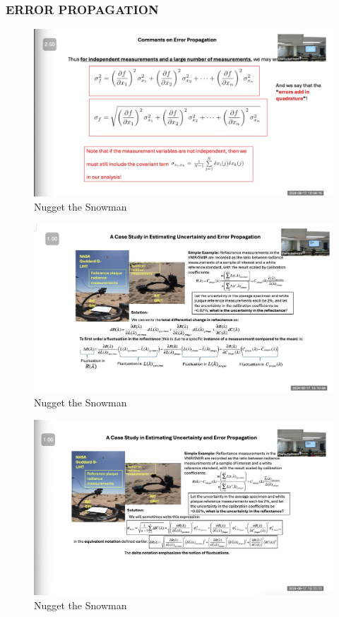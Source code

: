 \documentclass{article}
\begin{document}
\clearpage
\subsubsection{ERROR PROPAGATION}

\begin{figure}[h!]
\centering
\includegraphics[scale=.6]{Radiometry/Week4/Notes/Sept17/Quadrature2.png}
\caption{Nugget the Snowman}
\label{fig:Quadrature2}
\end{figure}


\begin{figure}[h!]
\centering
\includegraphics[scale=.6]{Radiometry/Week4/Notes/Sept17/Goiniometer.png}
\caption{Nugget the Snowman}
\label{fig:Goiniometer}
\end{figure}


\begin{figure}[h!]
\centering
\includegraphics[scale=.6]{Radiometry/Week4/Notes/Sept17/Goiniometer2.png}
\caption{Nugget the Snowman}
\label{fig:Goiniometer2}
\end{figure}
\clearpage
\end{document}
